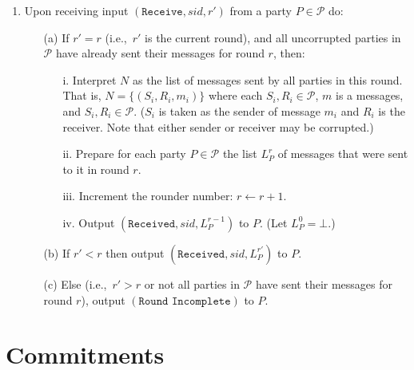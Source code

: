 \documentclass[a4paper]{article}
\begin{document}
\begin{framed}
\begin{enumerate}
        \item Upon receiving input $(\texttt{Receive}, sid, r')$ from a party $P \in \mathcal{P}$ do:
            \begin{enumerate}
                \item[(a)] If $r' = r$ (i.e.,\ $r'$ is the current round), and all uncorrupted parties in $\mathcal{P}$ have already sent their messages for round $r$, then:
                    \begin{enumerate}
                        \item[i.] Interpret $N$ as the list of messages sent by all parties in this round. That is, $N = \{(S_i, R_i, m_i)\}$ where each $S_i, R_i \in \mathcal{P}$, $m$ is a messages, and $S_i, R_i \in \mathcal{P}$. ($S_i$ is taken as the sender of message $m_i$ and $R_i$ is the receiver. Note that either sender or receiver may be corrupted.)
                        \item[ii.] Prepare for each party $P \in \mathcal{P}$ the list $L^r_P$ of messages that were sent to it in round $r$.
                        \item[iii.] Increment the rounder number: $r \leftarrow r + 1$.
                        \item[iv.] Output $(\texttt{Received}, sid, L^{r-1}_P)$ to $P$. (Let $L^0_P = \bot$.)
                    \end{enumerate}
                \item[(b)] If $r' < r$ then output $(\texttt{Received}, sid, L^{r'}_P)$ to $P$.
                \item[(c)] Else (i.e.,\ $r' > r$ or not all parties in $\mathcal{P}$ have sent their messages for round $r$), output $(\texttt{Round Incomplete})$ to $P$.
            \end{enumerate}
    \end{enumerate}
\end{framed}

\section{Commitments}
\end{document}
